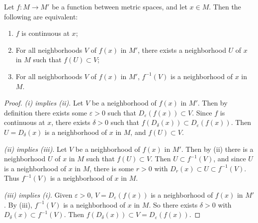 \begin{proposition}
    Let $f: M \rightarrow M'$ be a function between metric spaces, and let $x \in M$. Then the following are equivalent:
    \begin{enumerate}[label=(\roman*)]
        \item $f$ is continuous at $x$;
        \item For all neighborhoods $V$ of $f(x)$ in $M'$, there exists a neighborhood $U$ of $x$ in $M$ such that $f(U) \subset V$;
        \item For all neighborhoods $V$ of $f(x)$ in $M'$, $f^{-1}(V)$ is a neighborhood of $x$ in $M$.
    \end{enumerate}
\end{proposition}
\begin{proof}
    \emph{(i) implies (ii)}. Let $V$ be a neighborhood of $f(x)$ in $M'$. Then by definition there exists some $\varepsilon > 0$ such that $D_{\varepsilon}(f(x)) \subset V$. Since $f$ is continuous at $x$, there exists $\delta > 0$ such that $f(D_{\delta}(x)) \subset D_\varepsilon(f(x))$. Then $U = D_{\delta}(x)$ is a neighborhood of $x$ in $M$, and $f(U) \subset V$.

    \emph{(ii) implies (iii)}. Let $V$ be a neighborhood of $f(x)$ in $M'$. Then by (ii) there is a neighborhood $U$ of $x$ in $M$ such that $f(U) \subset V$. Then $U \subset f^{-1}(V)$, and since $U$ is a neighborhood of $x$ in $M$, there is some $r > 0$ with $D_r(x) \subset U \subset f^{-1}(V)$. Thus $f^{-1}(V)$ is a neighborhood of $x$ in $M$.

    \emph{(iii) implies (i)}.
    Given $\varepsilon > 0$, $V = D_{\varepsilon}(f(x))$ is a neighborhood of $f(x)$ in $M'$. By (iii), $f^{-1}(V)$ is a neighborhood of $x$ in $M$. So there exists $\delta > 0$ with $D_{\delta}(x) \subset f^{-1}(V)$. Then $f(D_{\delta}(x)) \subset V = D_{\varepsilon}(f(x))$.
\end{proof}

